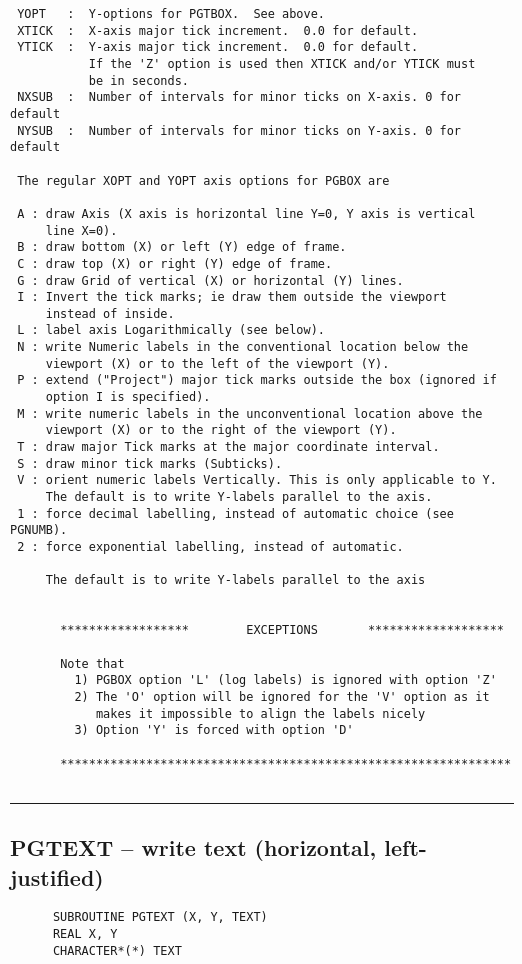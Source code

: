 {\begin{verbatim}
 YOPT   :  Y-options for PGTBOX.  See above.
 XTICK  :  X-axis major tick increment.  0.0 for default. 
 YTICK  :  Y-axis major tick increment.  0.0 for default. 
           If the 'Z' option is used then XTICK and/or YTICK must
           be in seconds.
 NXSUB  :  Number of intervals for minor ticks on X-axis. 0 for default
 NYSUB  :  Number of intervals for minor ticks on Y-axis. 0 for default

 The regular XOPT and YOPT axis options for PGBOX are

 A : draw Axis (X axis is horizontal line Y=0, Y axis is vertical
     line X=0).
 B : draw bottom (X) or left (Y) edge of frame.
 C : draw top (X) or right (Y) edge of frame.
 G : draw Grid of vertical (X) or horizontal (Y) lines.
 I : Invert the tick marks; ie draw them outside the viewport
     instead of inside.
 L : label axis Logarithmically (see below).
 N : write Numeric labels in the conventional location below the
     viewport (X) or to the left of the viewport (Y).
 P : extend ("Project") major tick marks outside the box (ignored if
     option I is specified).
 M : write numeric labels in the unconventional location above the
     viewport (X) or to the right of the viewport (Y).
 T : draw major Tick marks at the major coordinate interval.
 S : draw minor tick marks (Subticks).
 V : orient numeric labels Vertically. This is only applicable to Y.
     The default is to write Y-labels parallel to the axis.
 1 : force decimal labelling, instead of automatic choice (see PGNUMB).
 2 : force exponential labelling, instead of automatic.

     The default is to write Y-labels parallel to the axis
 

       ******************        EXCEPTIONS       *******************

       Note that 
         1) PGBOX option 'L' (log labels) is ignored with option 'Z'
         2) The 'O' option will be ignored for the 'V' option as it 
            makes it impossible to align the labels nicely
         3) Option 'Y' is forced with option 'D'

       ***************************************************************


\end{verbatim}
\hrule


\subsection*{PGTEXT -- write text (horizontal, left-justified) }
\begin{verbatim}
      SUBROUTINE PGTEXT (X, Y, TEXT)
      REAL X, Y
      CHARACTER*(*) TEXT


\end{verbatim}}
